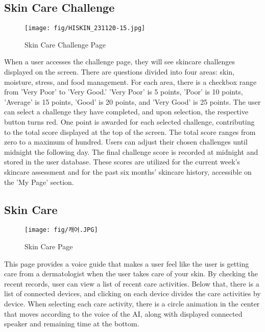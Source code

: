\documentclass[conference]{IEEEtran}
\begin{document}
\subsection{Skin Care Challenge} 
    \begin{figure}[h]
    \centering
    \texttt{[image: fig/HISKIN\_231120-15.jpg]}
    \label{fig:Skin Care Challenge Page}
    \caption{Skin Care Challenge Page} 
    \end{figure}
    When a user accesses the challenge page, they will see  skincare challenges displayed on the screen. There are questions divided into four areas: skin, moisture, stress, and food management. For each area, there is a checkbox range from 'Very Poor' to 'Very Good.' 'Very Poor' is 5 points, 'Poor' is 10 points, 'Average' is 15 points, 'Good' is 20 points, and 'Very Good' is 25 points.
    The user can select a challenge they have completed, and upon selection, the respective button turns red. One point is awarded for each selected challenge, contributing to the total score displayed at the top of the screen. The total score ranges from zero to a maximum of hundred.
    Users can adjust their chosen challenges until midnight the following day. The final challenge score is recorded at midnight and stored in the user database. These scores are utilized for the current week’s skincare assessment and for the past six months’ skincare history, accessible on the 'My Page' section.

\subsection{Skin Care}
\begin{figure}[h]
    \centering
    \texttt{[image: fig/캐어.JPG]}
    \label{fig:Skin Care Page}
    \caption{Skin Care Page} 
    \end{figure}
This page provides a voice guide that makes a user feel like the user is getting care from a dermatologist when the user takes care of your skin. By checking the recent records, user can view a list of recent care activities. Below that, there is a list of connected devices, and clicking on each device divides the care activities by device. When selecting each care activity, there is a circle animation in the center that moves according to the voice of the AI, along with displayed connected speaker and remaining time at the bottom.\\
\end{document}
